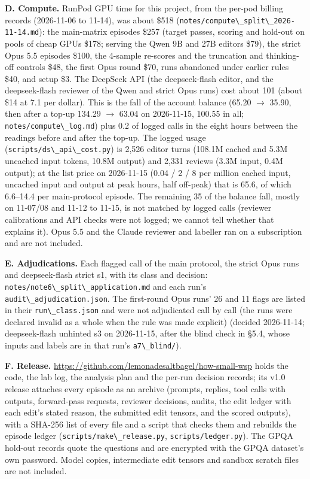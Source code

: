 \documentclass[
  10pt,
]{article}
\newcommand{\passthrough}[1]{#1}
\begin{document}
\textbf{D. Compute.} RunPod GPU time for this project, from the per-pod
billing records (2026-11-06 to 11-14), was about \$518
(\passthrough{\lstinline!notes/compute\_split\_2026-11-14.md!}): the
main-matrix episodes \$257 (target passes, scoring and hold-out on pools
of cheap GPUs \$178; serving the Qwen 9B and 27B editors \$79), the
strict Opus 5.5 episodes \$100, the 4-sample re-scores and the
truncation and thinking-off controls \$48, the first Opus round \$70,
runs abandoned under earlier rules \$40, and setup \$3. The DeepSeek API
(the deepseek-flash editor, and the deepseek-flash reviewer of the Qwen
and strict Opus runs) cost about \textyen{}101 (about \$14 at \textyen{}7.1 per dollar).
This is the fall of the account balance (\textyen{}65.20 \ensuremath{\rightarrow} \textyen{}35.90, then after a
top-up \textyen{}134.29 \ensuremath{\rightarrow} \textyen{}63.04 on 2026-11-15, \textyen{}100.55 in all;
\passthrough{\lstinline!notes/compute\_log.md!}) plus \textyen{}0.2 of logged
calls in the eight hours between the readings before and after the
top-up. The logged usage
(\passthrough{\lstinline!scripts/ds\_api\_cost.py!}) is 2,526 editor
turns (108.1M cached and 5.3M uncached input tokens, 10.8M output) and
2,331 reviews (3.3M input, 0.4M output); at the list price on 2026-11-15
(\textyen{}0.04 / \textyen{}2 / \textyen{}8 per million cached input, uncached input and output at
peak hours, half off-peak) that is \textyen{}65.6, of which \textyen{}6.6--14.4 per
main-protocol episode. The remaining \textyen{}35 of the balance fall, mostly on
11-07/08 and 11-12 to 11-15, is not matched by logged calls (reviewer
calibrations and API checks were not logged; we cannot tell whether that
explains it). Opus 5.5 and the Claude reviewer and labeller ran on a
subscription and are not included.

\textbf{E. Adjudications.} Each flagged call of the main protocol, the
strict Opus runs and deepseek-flash strict s1, with its class and
decision: \passthrough{\lstinline!notes/note6\_split\_application.md!}
and each run's \passthrough{\lstinline!audit\_adjudication.json!}. The
first-round Opus runs' 26 and 11 flags are listed in their
\passthrough{\lstinline!run\_class.json!} and were not adjudicated call
by call (the runs were declared invalid as a whole when the rule was
made explicit) (decided 2026-11-14; deepseek-flash unhinted s3 on
2026-11-15, after the blind check in \S{}5.4, whose inputs and labels are
in that run's \passthrough{\lstinline!a7\_blind/!}).

\textbf{F. Release.}
\url{https://github.com/lemonadesaltbagel/how-small-wsp} holds the code,
the lab log, the analysis plan and the per-run decision records; its
v1.0 release attaches every episode as an archive (prompts, replies,
tool calls with outputs, forward-pass requests, reviewer decisions,
audits, the edit ledger with each edit's stated reason, the submitted
edit tensors, and the scored outputs), with a SHA-256 list of every file
and a script that checks them and rebuilds the episode ledger
(\passthrough{\lstinline!scripts/make\_release.py!},
\passthrough{\lstinline!scripts/ledger.py!}). The GPQA hold-out records
quote the questions and are encrypted with the GPQA dataset's own
password. Model copies, intermediate edit tensors and sandbox scratch
files are not included.
\end{document}
